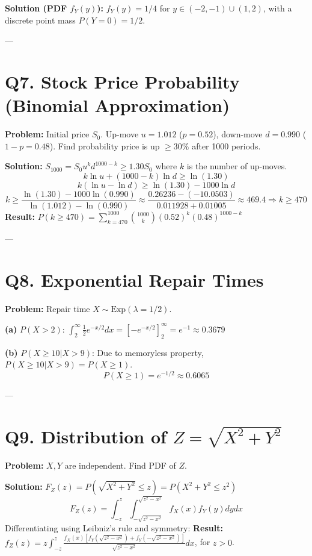\documentclass{article}
\begin{document}
\textbf{Solution (PDF $f_Y(y)$):} $f_Y(y) = 1/4$ for $y \in (-2, -1) \cup (1, 2)$, with a discrete point mass $P(Y=0) = 1/2$.

---

\section*{Q7. Stock Price Probability (Binomial Approximation)}
\textbf{Problem:} Initial price $S_0$. Up-move $u=1.012$ ($p=0.52$), down-move $d=0.990$ ($1-p=0.48$). Find probability price is up $\ge 30\%$ after 1000 periods.

\textbf{Solution:}
$S_{1000} = S_0 u^k d^{1000-k} \ge 1.30 S_0$ where $k$ is the number of up-moves.
\[ k \ln u + (1000-k) \ln d \ge \ln(1.30) \]
\[ k(\ln u - \ln d) \ge \ln(1.30) - 1000 \ln d \]
\[ k \ge \frac{\ln(1.30) - 1000 \ln(0.990)}{\ln(1.012) - \ln(0.990)} \approx \frac{0.26236 - (-10.0503)}{0.011928 + 0.01005} \approx 469.4 \Rightarrow k \ge 470 \]
\textbf{Result:} $P(k \ge 470) = \sum_{k=470}^{1000} \binom{1000}{k} (0.52)^k (0.48)^{1000-k}$

---

\section*{Q8. Exponential Repair Times}
\textbf{Problem:} Repair time $X \sim \text{Exp}(\lambda=1/2)$.

\textbf{(a)} $P(X > 2)$: $\int_{2}^{\infty} \frac{1}{2}e^{-x/2}dx = \left[ -e^{-x/2} \right]_2^\infty = e^{-1} \approx 0.3679$

\textbf{(b)} $P(X \ge 10 | X > 9)$: Due to memoryless property, $P(X \ge 10 | X > 9) = P(X \ge 1)$.
\[ P(X \ge 1) = e^{-1/2} \approx 0.6065 \]

---

\section*{Q9. Distribution of $Z = \sqrt{X^2 + Y^2}$}
\textbf{Problem:} $X, Y$ are independent. Find PDF of $Z$.

\textbf{Solution:}
$F_Z(z) = P(\sqrt{X^2 + Y^2} \le z) = P(X^2 + Y^2 \le z^2)$
\[ F_Z(z) = \int_{-z}^{z} \int_{-\sqrt{z^2-x^2}}^{\sqrt{z^2-x^2}} f_X(x) f_Y(y) dy dx \]
Differentiating using Leibniz's rule and symmetry:
\textbf{Result:} $f_Z(z) = z \int_{-z}^{z} \frac{f_X(x) [f_Y(\sqrt{z^2-x^2}) + f_Y(-\sqrt{z^2-x^2})]}{\sqrt{z^2-x^2}} dx$, for $z > 0$.
\end{document}
